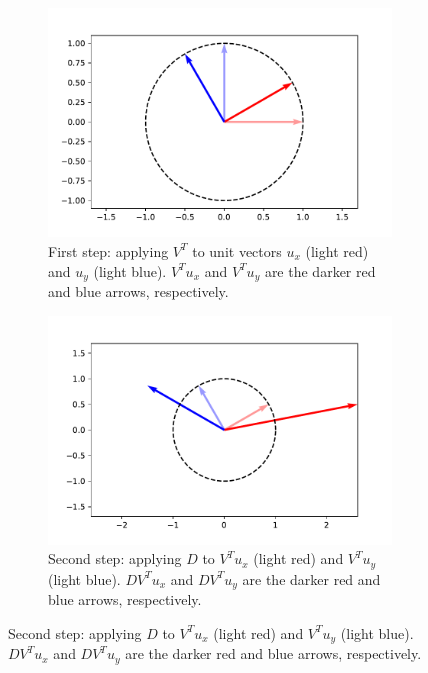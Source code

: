 \documentclass{article}
\theoremstyle{definition}
\begin{document}
\begin{figure}[ht]
    \centering 
    \begin{subfigure}[t]{\linewidth}
        \centering
        \includegraphics[scale=0.45]{images/lin_alg/svd_v.pdf}
        \caption{First step: applying $V^T$ to unit vectors $u_x$ (light red) and $u_y$ (light blue). $V^Tu_x$ and $V^Tu_y$ are the darker red and blue arrows, respectively.}
        \label{linalg-fig:svd-v}
    \end{subfigure}%
    
    \begin{subfigure}[t]{\linewidth}
        \centering
        \includegraphics[scale=0.45]{images/lin_alg/svd_d.pdf}
        \caption{Second step: applying $D$ to $V^Tu_x$ (light red) and $V^Tu_y$ (light blue). $DV^Tu_x$ and $DV^Tu_y$ are the darker red and blue arrows, respectively.}
        \label{linalg-fig:svd-d}
    \end{subfigure}%
    

\end{figure}
\end{document}
